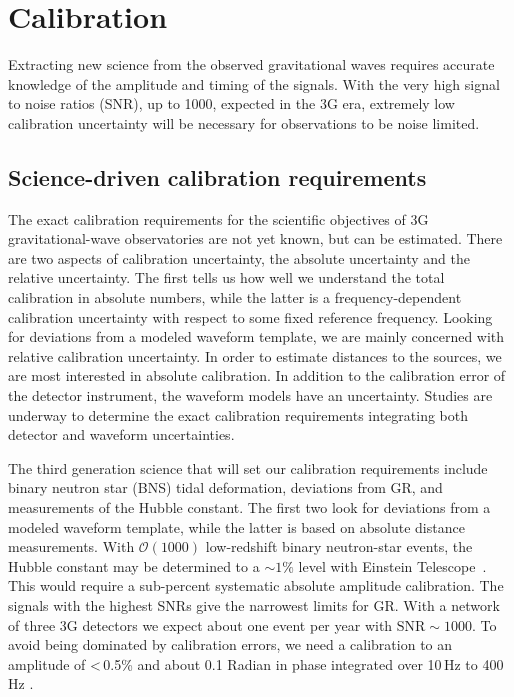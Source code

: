 \chapter{Calibration}
\label{sec:Calibration}


Extracting new science from the observed gravitational waves requires accurate knowledge of the amplitude and timing of the signals. With the very high signal to noise ratios (SNR), up to 1000, expected in the 3G era, extremely low calibration uncertainty will be necessary for observations to be noise limited.

\section{Science-driven calibration requirements}
The exact calibration requirements for the scientific objectives of 3G gravitational-wave observatories are not yet known, but can be estimated. There are two aspects of calibration uncertainty, the absolute uncertainty and the relative uncertainty. The first tells us how well we understand the total calibration in absolute numbers, while the latter is a frequency-dependent calibration uncertainty with respect to some fixed reference frequency. 
Looking for deviations from a modeled waveform template, we are mainly concerned with relative calibration uncertainty. In order to estimate distances to the sources, we are most interested in absolute calibration.
In addition to the calibration error of the detector instrument, the waveform models have an uncertainty.
Studies are underway to determine the exact calibration requirements integrating both detector and waveform uncertainties.

The third generation science that will set our calibration requirements include binary neutron star (BNS) tidal deformation, deviations from GR, and measurements of the Hubble constant. The first two look for deviations from a modeled waveform template, while the latter is based on absolute distance measurements. With $\mathcal{O}(1000)$ low-redshift binary neutron-star events, the Hubble constant may be determined to a ${\sim}1\%$ level with Einstein Telescope~\cite{Cai:2016sby}.
This would require a sub-percent systematic absolute amplitude calibration.
The signals with the highest SNRs give the narrowest limits for GR. With a network of three 3G detectors we expect about one event per year with $\text{SNR} \sim 1000$. To avoid being dominated by calibration errors, we need a calibration to an amplitude of <\,0.5\% and
about 0.1 Radian in phase integrated over 10\,Hz to 400\,Hz \cite{SathyaPers2019}.


